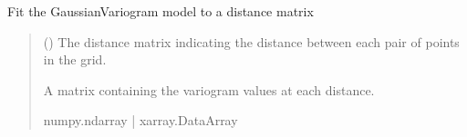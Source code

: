 \documentclass[letterpaper,10pt,english]{sphinxmanual}
\begin{document}
\begin{fulllineitems}
\begin{fulllineitems}
\label{\detokenize{covariance:glomar_gridding.variogram.GaussianVariogram.fit}}
\pysigstartsignatures
\pysiglinewithargsret
{}
{}
{}
\pysigstopsignatures
\sphinxAtStartPar
Fit the GaussianVariogram model to a distance matrix
\begin{quote}\begin{description}
\sphinxAtStartPar
{} (\sphinxstyleliteralemphasis{\sphinxupquote{ | }}) \textendash{} The distance matrix indicating the distance between each pair of
points in the grid.

\sphinxAtStartPar
A matrix containing the variogram values at each distance.

\sphinxAtStartPar
numpy.ndarray | xarray.DataArray

\end{description}\end{quote}

\end{fulllineitems}


\end{fulllineitems}

\end{document}
